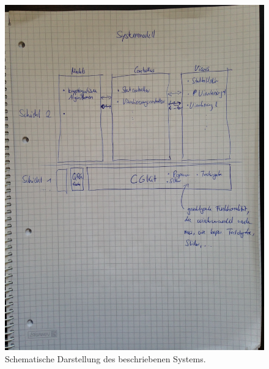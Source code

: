 \documentclass{article}
\begin{document}
\begin{figure}[h!]
  \centering
    \includegraphics[width=\textwidth]{systemmodel-draft.jpg}
  \caption{Schematische Darstellung des beschriebenen Systems.}
\end{figure}
\end{document}
